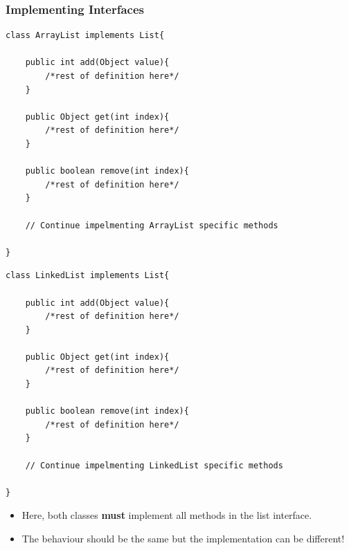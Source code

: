 \documentclass{beamer}
\begin{document}
\begin{frame}[fragile]
    \frametitle{Implementing Interfaces}
    \begin{minipage}{0.49\textwidth}
        \begin{lstlisting}[basicstyle=\tiny]
class ArrayList implements List{

    public int add(Object value){
        /*rest of definition here*/
    }
    
    public Object get(int index){
        /*rest of definition here*/
    }
    
    public boolean remove(int index){
        /*rest of definition here*/
    }

    // Continue impelmenting ArrayList specific methods
    
}
        \end{lstlisting}
    \end{minipage}
    \begin{minipage}{0.49\textwidth}
        \begin{lstlisting}[basicstyle=\tiny]
class LinkedList implements List{

    public int add(Object value){
        /*rest of definition here*/
    }
    
    public Object get(int index){
        /*rest of definition here*/
    }
    
    public boolean remove(int index){
        /*rest of definition here*/
    }

    // Continue impelmenting LinkedList specific methods
    
}
        \end{lstlisting}
    \end{minipage}
    \begin{itemize}
        \item Here, both classes \textbf{must} implement all methods in the list interface.
            
        \item The behaviour should be the same but the implementation can be different!
    \end{itemize}
\end{frame}
\end{document}
